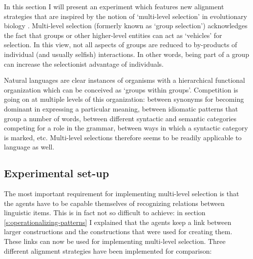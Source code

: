 In this section I will present an experiment which features new alignment strategies that are inspired by the notion of `multi-level selection' in evolutionary biology \citep{wilson94group}. Multi-level selection (formerly known as `group selection') acknowledges the fact that groups or other higher-level entities can act as `vehicles' for selection. In this view, not all aspects of groups are reduced to by-products of individual (and usually selfish) interactions. In other words, being part of a group can increase the selectionist advantage of individuals.%

Natural languages are clear instances of organisms with a hierarchical functional organization which can be conceived as `groups within groups'. Competition is going on at multiple levels of this organization: between synonyms for becoming dominant in expressing a particular meaning, between idiomatic patterns that group a number of words, between different syntactic and semantic categories competing for a role in the grammar, between ways in which a syntactic category is marked, etc. Multi-level selections therefore seems to be readily applicable to language as well.

\subsection{Experimental set-up}

The most important requirement for implementing multi-level selection is that the agents have to be capable themselves of recognizing relations between linguistic items. This is in fact not so difficult to achieve: in section \ref{s:operationalizing-patterns} I explained that the agents keep a link between larger constructions and the constructions that were used for creating them. These links can now be used for implementing multi-level selection. Three different alignment strategies have been implemented for comparison:

